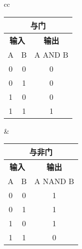 \begin{tabular}{cc}%
  \begin{tabular}{|c|c|c|}
    \multicolumn{3}{c}{\textbf{与门}}                           \\
    \hline
    \multicolumn{2}{|c|}{\textbf{输入}} & \textbf{输出}           \\
    \hline
    A                                 & B           & A AND B \\
    \hline
    \num{0}                           & \num{0}     & \num{0} \\
    \hline
    \num{0}                           & \num{1}     & \num{0} \\
    \hline
    \num{1}                           & \num{0}     & \num{0} \\
    \hline
    \num{1}                           & \num{1}     & \num{1} \\
    \hline
  \end{tabular} &
  \begin{tabular}{|c|c|c|}
    \multicolumn{3}{c}{\textbf{与非门}}                           \\
    \hline
    \multicolumn{2}{|c|}{\textbf{输入}} & \textbf{输出}            \\
    \hline
    A                                 & B           & A NAND B \\
    \hline
    \num{0}                           & \num{0}     & \num{1}  \\
    \hline
    \num{0}                           & \num{1}     & \num{1}  \\
    \hline
    \num{1}                           & \num{0}     & \num{1}  \\
    \hline
    \num{1}                           & \num{1}     & \num{0}  \\
    \hline
  \end{tabular} \tabularnewline
\end{tabular}

\bigskip

